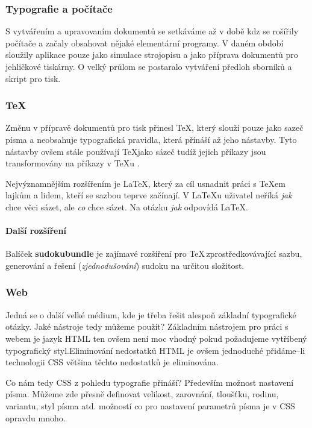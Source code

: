 \documentclass[11pt,a4paper,onecolumn]{article}
\begin{document}
\subsubsection*{Typografie a počítače}
S vytvářením a upravovaním dokumentů se setkáváme až v době kdz se rošířily počítače a začaly obsahovat nějaké elementární programy. V daném období sloužily aplikace pouze jako simulace strojopisu a jako příprava dokumentů pro jehličkové tiskárny. O velký průlom se postaralo vytváření předloh sborníků a skript pro tisk. \citep{Rybicka:typografie_a_tex}

\subsubsection*{TeX}

Změnu v přípravě dokumentů pro tisk přinesl \TeX , který slouží pouze jako sazeč písma a neobsahuje typografická pravidla, která přínáší až jeho nástavby. Tyto nástavby ovšem stále používají \TeX jako sázeč tudíž jejich příkazy jsou transformovány na příkazy v \TeX u . \citep{Lamport:latex_a_document_preparation_system}

Nejvýznamnějším rozšířením je \LaTeX , který za cíl usnadnit práci s \TeX em lajkům a lidem, kteří se sazbou teprve začínají. V \LaTeX u uživatel neříká \textit{jak} chce věci sázet, ale \textit{co} chce sázet. Na otázku \textit{jak} odpovídá \LaTeX . \citep{Rybicka:latex_pro_zacatecniky}
\paragraph*{Další rozšíření}
Balíček \textbf{sudokubundle} je zajímavé rozšíření pro \TeX \,zprostředkovávající sazbu, generování a řešení (\textit{zjednodušování}) sudoku na určitou složitost. \citep{Wilson:sudokubundle}

\subsubsection*{Web}
Jedná se o další velké médium, kde je třeba řešit alespoň základní typografické otázky. \citep{Stastny:navrh_internetovych_stranek}
Jaké nástroje tedy můžeme použít? Základním nástrojem pro práci s webem je jazyk HTML ten ovšem není moc vhodný pokud požadujeme vytříbený typografický styl.Eliminování nedostatků HTML je ovšem jednoduché přidáme--li technologii CSS většina těchto nedostatků je eliminována. \citep{Pecina:typografie_na_webu}

Co nám tedy CSS z pohledu typografie přináší? Především možnost nastavení písma. Můžeme zde přesně definovat velikost, zarovnání, tloušťku, rodinu, variantu, styl písma atd. možností co pro nastavení parametrů písma je v CSS opravdu mnoho. \citep{Polakovic:CSS}

\newpage

\renewcommand{\refname}{Literatura}

\end{document}
